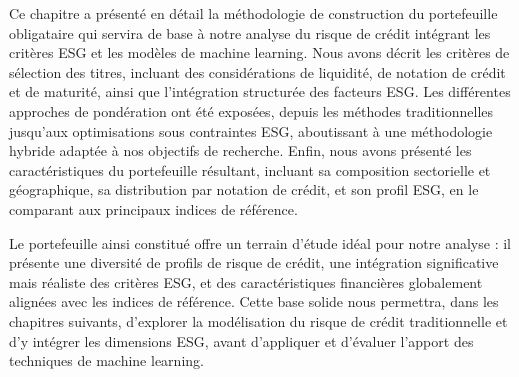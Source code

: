 Ce chapitre a présenté en détail la méthodologie de construction du portefeuille obligataire qui servira de base à notre analyse du risque de crédit intégrant les critères ESG et les modèles de machine learning. Nous avons décrit les critères de sélection des titres, incluant des considérations de liquidité, de notation de crédit et de maturité, ainsi que l'intégration structurée des facteurs ESG. Les différentes approches de pondération ont été exposées, depuis les méthodes traditionnelles jusqu'aux optimisations sous contraintes ESG, aboutissant à une méthodologie hybride adaptée à nos objectifs de recherche. Enfin, nous avons présenté les caractéristiques du portefeuille résultant, incluant sa composition sectorielle et géographique, sa distribution par notation de crédit, et son profil ESG, en le comparant aux principaux indices de référence.

Le portefeuille ainsi constitué offre un terrain d'étude idéal pour notre analyse : il présente une diversité de profils de risque de crédit, une intégration significative mais réaliste des critères ESG, et des caractéristiques financières globalement alignées avec les indices de référence. Cette base solide nous permettra, dans les chapitres suivants, d'explorer la modélisation du risque de crédit traditionnelle et d'y intégrer les dimensions ESG, avant d'appliquer et d'évaluer l'apport des techniques de machine learning.